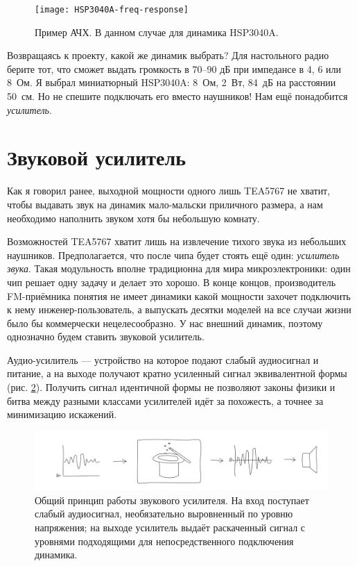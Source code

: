 \begin{figure}
  \centering
  \texttt{[image: HSP3040A-freq-response]}
  \caption{Пример АЧХ. В данном случае для динамика HSP3040A.}
  \label{fig:hsp3040a-freq-response}
\end{figure}

Возвращаясь к проекту, какой же динамик выбрать? Для настольного радио берите тот, что сможет выдать громкость в 70--90 дБ при импедансе в 4, 6 или 8~Ом. Я выбрал миниатюрный HSP3040A: 8~Ом, 2~Вт, 84~дБ на расстоянии 50~см. Но не спешите подключать его вместо наушников! Нам ещё понадобится \emph{усилитель}.

\section{Звуковой усилитель}

Как я говорил ранее, выходной мощности одного лишь TEA5767 не хватит, чтобы выдавать звук на динамик мало-мальски приличного размера, а нам необходимо наполнить звуком хотя бы небольшую комнату.

Возможностей TEA5767 хватит лишь на извлечение тихого звука из небольших наушников. Предполагается, что после чипа будет стоять ещё один: \emph{усилитель звука}. Такая модульность вполне традиционна для мира микроэлектроники: один чип решает одну задачу и делает это хорошо. В конце концов, производитель FM-приёмника понятия не имеет динамики какой мощности захочет подключить к нему инженер-пользователь, а выпускать десятки моделей на все случаи жизни было бы коммерчески нецелесообразно. У нас внешний динамик, поэтому однозначно будем ставить звуковой усилитель.

Аудио-усилитель — устройство на которое подают слабый аудиосигнал и питание, а на выходе получают кратно усиленный сигнал эквивалентной формы (рис. \ref{fig:sound-amp-diagram}). Получить сигнал идентичной формы не позволяют законы физики и битва между разными классами усилителей идёт за похожесть, а точнее за минимизацию искажений.

\begin{figure}
  \centering
  \includegraphics{sketches/sound-amp-diagram}
  \caption{Общий принцип работы звукового усилителя. На вход поступает слабый аудиосигнал, необязательно выровненный по уровню напряжения; на выходе усилитель выдаёт раскаченный сигнал с уровнями подходящими для непосредственного подключения динамика.}
  \label{fig:sound-amp-diagram}
\end{figure}

